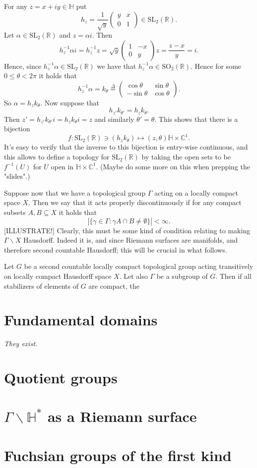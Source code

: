 \documentclass{article}
\theoremstyle{definition}
\begin{document}
For any $z=x+iy\in\mathbb{H}$ put
\[h_z=\frac{1}{\sqrt{y}}\begin{pmatrix}y&x\\0&1\end{pmatrix}\in\mathrm{SL}_2(\mathbb{R}).\]
Let $\alpha\in\mathrm{SL}_2(\mathbb{R})$ and $z=\alpha i$. Then
\[h_z^{-1}\alpha i=h_z^{-1}z=\sqrt{y}\begin{pmatrix}1&-x\\0&y\end{pmatrix}z=\frac{z-x}{y}=i.\]
Hence, since $h_z^{-1}\alpha\in\mathrm{SL}_2(\mathbb{R})$ we have that $h_z^{-1}\alpha\in\mathrm{SO}_2(\mathbb{R})$. Hence for some $0\leq\theta<2\pi$ it holds that
\[h_z^{-1}\alpha=k_\theta\overset{\Delta}{=}\begin{pmatrix}\cos\theta&\sin\theta\\-\sin\theta&\cos\theta\end{pmatrix}.\]
So $\alpha=h_zk_\theta$. Now suppose that
\[h_{z'}k_{\theta'}=h_zk_\theta.\]
Then $z'=h_{z'}k_{\theta'}i=h_zk_\theta i=z$ and similarly $\theta'=\theta$. This shows that there is a bijection
\[f:\mathrm{SL}_2(\mathbb{R})\ni (h_zk_\theta)\mapsto(z,\theta)\mathbb{H}\times\mathbb{C}^1.\]
It's easy to verify that the inverse to this bijection is entry-wise continuous, and this allows to define a topology for $\mathrm{SL}_2(\mathbb{R})$ by taking the open sets to be $f^{-1}(U)$ for $U$ open in $\mathbb{H}\times\mathbb{C}^1$. (Maybe do some more on this when prepping the "slides".)

Suppose now that we have a topological group $\Gamma$ acting on a locally compact space $X$. Then we say that it acts properly discontinuously if for any compact subsets $A,B\subseteq X$ it holds that
\[|\{\gamma\in\Gamma:\gamma A\cap B\neq\emptyset\}|<\infty.\]
[ILLUSTRATE!]
Clearly, this must be some kind of condition relating to making $\Gamma\backslash X$ Hausdorff. Indeed it is, and since Riemann surfaces are manifolds, and therefore second countable Hausdorff; this will be crucial in what follows.

Let $G$ be a second countable locally compact topological group acting transitively on locally compact Hausdorff space $X$. Let also $\Gamma$ be a subgroup of $G$. Then if all stabilizers of elements of $G$ are compact, the 
\section{Fundamental domains}
{\it They exist.}
\section{Quotient groups}
\section{$\Gamma\backslash\mathbb{H}^\ast$ as a Riemann surface}
\section{Fuchsian groups of the first kind}
\end{document}
